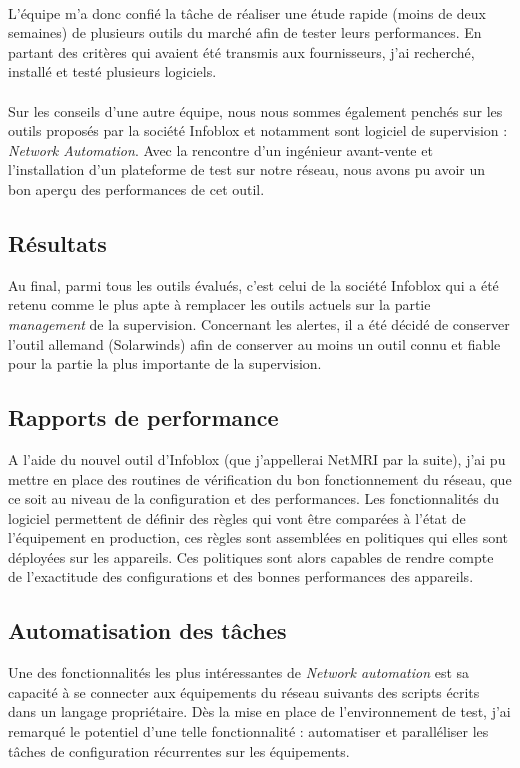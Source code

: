 \documentclass[a4paper,12pt]{report}
\begin{document}
\paragraph{}
L'équipe m'a donc confié la tâche de réaliser une étude rapide (moins de deux semaines) de plusieurs outils du marché afin de tester leurs performances. En partant des critères qui avaient été transmis aux fournisseurs, j'ai recherché, installé et testé plusieurs logiciels.
\paragraph{}
Sur les conseils d'une autre équipe, nous nous sommes également penchés sur les outils proposés par la société Infoblox et notamment sont logiciel de supervision : \textit{Network Automation}. Avec la rencontre d'un ingénieur avant-vente et l'installation d'un plateforme de test sur notre réseau, nous avons pu avoir un bon aperçu des performances de cet outil.

\subsection{Résultats}
Au final, parmi tous les outils évalués, c'est celui de la société Infoblox qui a été retenu comme le plus apte à remplacer les outils actuels sur la partie \textit{management} de la supervision. Concernant  les alertes, il a été décidé de conserver l'outil allemand (Solarwinds) afin de conserver au moins un outil connu et fiable pour la partie la plus importante de la supervision.

\subsection{Rapports de performance}
A l'aide du nouvel outil d'Infoblox (que j'appellerai NetMRI par la suite), j'ai pu mettre en place des routines de vérification du bon fonctionnement du réseau, que ce soit au niveau de la configuration et des performances. Les fonctionnalités du logiciel permettent de définir des règles qui vont être comparées à l'état de l'équipement en production, ces règles sont assemblées en politiques qui elles sont déployées sur les appareils. Ces politiques sont alors capables de rendre compte de l'exactitude des configurations et des bonnes performances des appareils.

\subsection{Automatisation des tâches}
Une des fonctionnalités les plus intéressantes de \textit{Network automation} est sa capacité à se connecter aux équipements du réseau suivants des scripts écrits dans un langage propriétaire. Dès la mise en place de l'environnement de test, j'ai remarqué le potentiel d'une telle fonctionnalité : automatiser et paralléliser les tâches de configuration récurrentes sur les équipements.
\end{document}
